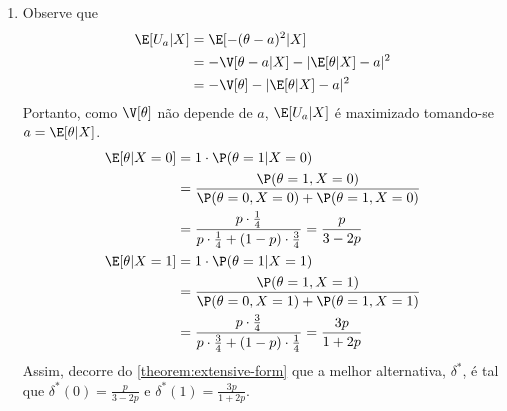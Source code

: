 {\begin{enumerate}[label=(\alph*)]
  \item Observe que
  \begin{align*}
   \E[U_{a}|X]
   &= \E[-(\theta-a)^{2}|X] \\
   &= -\V[\theta-a|X]-|\E[\theta|X]-a|^{2} \\
   &= -\V[\theta] -|\E[\theta|X]-a|^{2}
  \end{align*}
  Portanto, como $\V[\theta]$ não depende de $a$,
  $\E[U_{a}|X]$ é maximizado tomando-se
  $a=\E[\theta|X]$.
  \begin{align*}
   \E[\theta|X=0] &= 1 \cdot \P(\theta=1|X=0) \\
   &= \frac{\P(\theta=1,X=0)}
   {\P(\theta=0,X=0)+\P(\theta=1,X=0)} \\
   &= \frac{p \cdot \frac{1}{4}}{p \cdot \frac{1}{4} + (1-p) \cdot \frac{3}{4}} = \frac{p}{3-2p} \\
   \E[\theta|X=1] &= 1 \cdot \P(\theta=1|X=1) \\
   &= \frac{\P(\theta=1,X=1)}
   {\P(\theta=0,X=1)+\P(\theta=1,X=1)} \\
   &= \frac{p \cdot \frac{3}{4}}{p \cdot \frac{3}{4} + (1-p) \cdot \frac{1}{4}} = \frac{3p}{1+2p}
  \end{align*}
  Assim, decorre do \cref{theorem:extensive-form} que
  a melhor alternativa, $\delta^{*}$, é tal que
  $\delta^{*}(0)=\frac{p}{3-2p}$ e
  $\delta^{*}(1)=\frac{3p}{1+2p}$.
  

\end{enumerate}}
